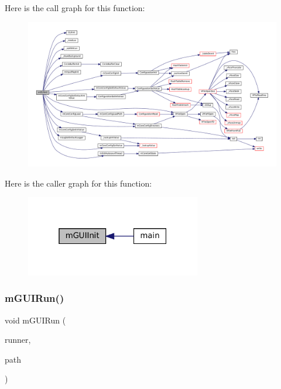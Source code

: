 Here is the call graph for this function\+:
\nopagebreak
\begin{figure}[H]
\begin{center}
\leavevmode
\includegraphics[width=350pt]{gui-runner_8c_a95b3becf7824ec02882a9db0686ce3a3_cgraph}
\end{center}
\end{figure}
Here is the caller graph for this function\+:
\nopagebreak
\begin{figure}[H]
\begin{center}
\leavevmode
\includegraphics[width=217pt]{gui-runner_8c_a95b3becf7824ec02882a9db0686ce3a3_icgraph}
\end{center}
\end{figure}
\mbox{\label{gui-runner_8c_a1285400b234548c4116a1965de5449eb}} 
\subsubsection{\texorpdfstring{m\+G\+U\+I\+Run()}{mGUIRun()}}
{\footnotesize\ttfamily void m\+G\+U\+I\+Run (\begin{DoxyParamCaption}\item[{struct \mbox{\hyperlink{structm_g_u_i_runner}{m\+G\+U\+I\+Runner}} $\ast$}]{runner,  }\item[{const char $\ast$}]{path }\end{DoxyParamCaption})}

